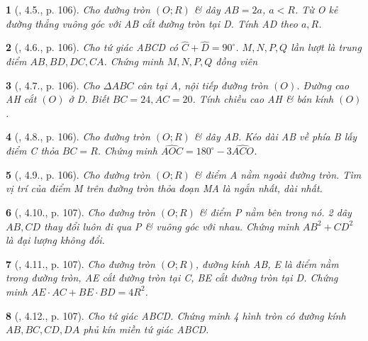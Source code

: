 \documentclass{article}
\newtheorem{baitoan}{}
\begin{document}
\begin{baitoan}[\cite{Binh_boi_duong_Toan_9_tap_1}, 4.5., p. 106]
	Cho đường tròn $(O;R)$ \& dây $AB = 2a$, $a < R$. Từ O kẻ đường thẳng vuông góc với AB cắt đường tròn tại D. Tính AD theo $a,R$.
\end{baitoan}

\begin{baitoan}[\cite{Binh_boi_duong_Toan_9_tap_1}, 4.6., p. 106]
	Cho tứ giác ABCD có $\widehat{C} + \widehat{D} = 90^\circ$. $M,N,P,Q$ lần lượt là trung điểm $AB,BD,DC,CA$. Chứng minh $M,N,P,Q$ đồng viên
\end{baitoan}

\begin{baitoan}[\cite{Binh_boi_duong_Toan_9_tap_1}, 4.7., p. 106]
	Cho $\Delta ABC$ cân tại A, nội tiếp đường tròn $(O)$. Đường cao AH cắt $(O)$ ở D. Biết $BC = 24,AC = 20$. Tính chiều cao AH \& bán kính $(O)$.
\end{baitoan}

\begin{baitoan}[\cite{Binh_boi_duong_Toan_9_tap_1}, 4.8., p. 106]
	Cho đường tròn $(O;R)$ \& dây AB. Kéo dài AB về phía B lấy điểm C thỏa $BC = R$. Chứng minh $\widehat{AOC} = 180^\circ - 3\widehat{ACO}$.
\end{baitoan}

\begin{baitoan}[\cite{Binh_boi_duong_Toan_9_tap_1}, 4.9., p. 106]
	Cho đường tròn $(O;R)$ \& điểm A nằm ngoài đường tròn. Tìm vị trí của điểm M trên đường tròn thỏa đoạn MA là ngắn nhất, dài nhất.
\end{baitoan}

\begin{baitoan}[\cite{Binh_boi_duong_Toan_9_tap_1}, 4.10., p. 107]
	Cho đường tròn $(O;R)$ \& điểm P nằm bên trong nó. 2 dây $AB,CD$ thay đổi luôn đi qua P \& vuông góc với nhau. Chứng minh $AB^2 + CD^2$ là đại lượng không đổi.
\end{baitoan}

\begin{baitoan}[\cite{Binh_boi_duong_Toan_9_tap_1}, 4.11., p. 107]
	Cho đường tròn $(O;R)$, đường kính AB, E là điểm nằm trong đường tròn, AE cắt đường tròn tại C, BE cắt đường tròn tại D. Chứng minh $AE\cdot AC + BE\cdot BD = 4R^2$.
\end{baitoan}

\begin{baitoan}[\cite{Binh_boi_duong_Toan_9_tap_1}, 4.12., p. 107]
	Cho tứ giác ABCD. Chứng minh 4 hình tròn có đường kính $AB,BC,CD,DA$ phủ kín miền tứ giác ABCD.
\end{baitoan}
\end{document}
